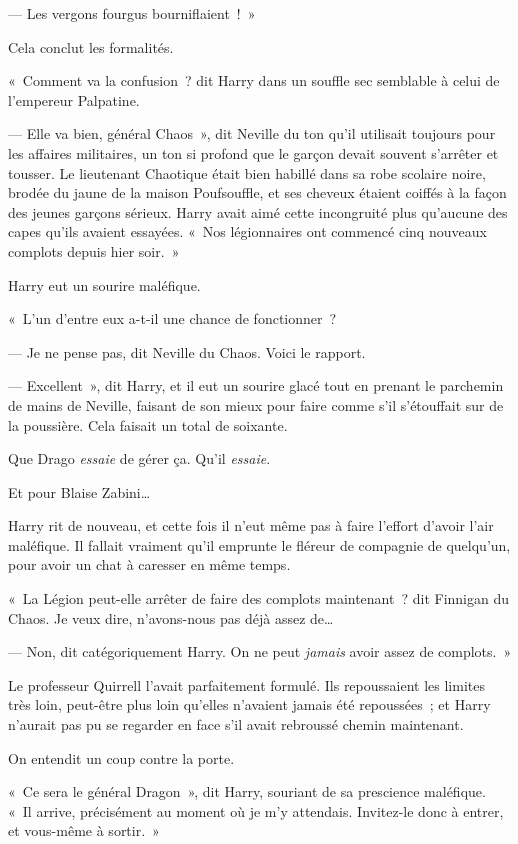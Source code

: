 --- Les vergons fourgus bourniflaient~!~»

Cela conclut les formalités.

«~Comment va la confusion~? dit Harry dans un souffle sec semblable à celui de l'empereur Palpatine.

--- Elle va bien, général Chaos~», dit Neville du ton qu'il utilisait toujours pour les affaires militaires, un ton si profond que le garçon devait souvent s'arrêter et tousser. Le lieutenant Chaotique était bien habillé dans sa robe scolaire noire, brodée du jaune de la maison Poufsouffle, et ses cheveux étaient coiffés à la façon des jeunes garçons sérieux. Harry avait aimé cette incongruité plus qu'aucune des capes qu'ils avaient essayées. «~Nos légionnaires ont commencé cinq nouveaux complots depuis hier soir.~»

Harry eut un sourire maléfique.

«~L'un d'entre eux a-t-il une chance de fonctionner~?

--- Je ne pense pas, dit Neville du Chaos. Voici le rapport.

--- Excellent~», dit Harry, et il eut un sourire glacé tout en prenant le parchemin de mains de Neville, faisant de son mieux pour faire comme s'il s'étouffait sur de la poussière. Cela faisait un total de soixante.

Que Drago \emph{essaie} de gérer ça. Qu'il \emph{essaie}.

Et pour Blaise Zabini…

Harry rit de nouveau, et cette fois il n'eut même pas à faire l'effort d'avoir l'air maléfique. Il fallait vraiment qu'il emprunte le fléreur de compagnie de quelqu'un, pour avoir un chat à caresser en même temps.

«~La Légion peut-elle arrêter de faire des complots maintenant~? dit Finnigan du Chaos. Je veux dire, n'avons-nous pas déjà assez de…

--- Non, dit catégoriquement Harry. On ne peut \emph{jamais} avoir assez de complots.~»

Le professeur Quirrell l'avait parfaitement formulé. Ils repoussaient les limites très loin, peut-être plus loin qu'elles n'avaient jamais été repoussées~; et Harry n'aurait pas pu se regarder en face s'il avait rebroussé chemin maintenant.

On entendit un coup contre la porte.

«~Ce sera le général Dragon~», dit Harry, souriant de sa prescience maléfique. «~Il arrive, précisément au moment où je m'y attendais. Invitez-le donc à entrer, et vous-même à sortir.~»

